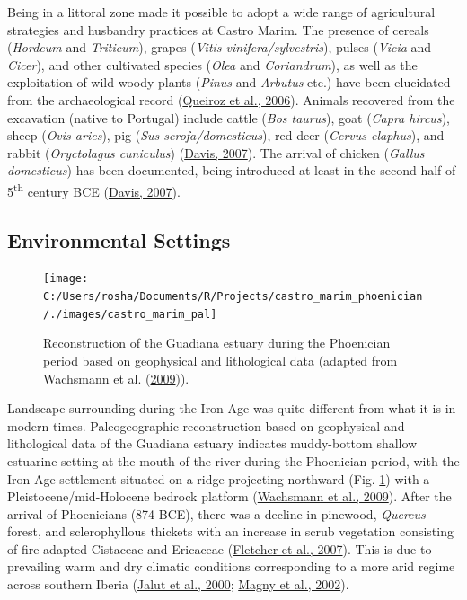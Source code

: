 \documentclass[preprint, 3p, authoryear]{elsarticle} %
\begin{document}
Being in a littoral zone made it possible to adopt a wide range of agricultural strategies and husbandry practices at Castro Marim. The presence of cereals (\emph{Hordeum} and \emph{Triticum}), grapes (\emph{Vitis vinifera/sylvestris}), pulses (\emph{Vicia} and \emph{Cicer}), and other cultivated species (\emph{Olea} and \emph{Coriandrum}), as well as the exploitation of wild woody plants (\emph{Pinus} and \emph{Arbutus} etc.) have been elucidated from the archaeological record (\protect\hyperlink{ref-queiroz_etal06}{Queiroz et al., 2006}). Animals recovered from the excavation (native to Portugal) include cattle (\emph{Bos taurus}), goat (\emph{Capra hircus}), sheep (\emph{Ovis aries}), pig (\emph{Sus scrofa/domesticus}), red deer (\emph{Cervus elaphus}), and rabbit (\emph{Oryctolagus cuniculus}) (\protect\hyperlink{ref-davis07}{Davis, 2007}). The arrival of chicken (\emph{Gallus domesticus}) has been documented, being introduced at least in the second half of 5\textsuperscript{th} century BCE (\protect\hyperlink{ref-davis07}{Davis, 2007}).

\hypertarget{environmental-settings}{%
\subsection{Environmental Settings}\label{environmental-settings}}



\begin{figure}

{\centering \texttt{[image: C:/Users/rosha/Documents/R/Projects/castro\_marim\_phoenician/./images/castro\_marim\_pal]} 

}

\caption{Reconstruction of the Guadiana estuary during the Phoenician period based on geophysical and lithological data (adapted from Wachsmann et al. (\protect\hyperlink{ref-wachsmann_etal09}{2009})).}\label{fig:castro-marim-pal}
\end{figure}

Landscape surrounding during the Iron Age was quite different from what it is in modern times. Paleogeographic reconstruction based on geophysical and lithological data of the Guadiana estuary indicates muddy-bottom shallow estuarine setting at the mouth of the river during the Phoenician period, with the Iron Age settlement situated on a ridge projecting northward (Fig. \ref{fig:castro-marim-pal}) with a Pleistocene/mid-Holocene bedrock platform (\protect\hyperlink{ref-wachsmann_etal09}{Wachsmann et al., 2009}). After the arrival of Phoenicians (874 BCE), there was a decline in pinewood, \emph{Quercus} forest, and sclerophyllous thickets with an increase in scrub vegetation consisting of fire-adapted Cistaceae and Ericaceae (\protect\hyperlink{ref-fletcher_etal07}{Fletcher et al., 2007}). This is due to prevailing warm and dry climatic conditions corresponding to a more arid regime across southern Iberia (\protect\hyperlink{ref-jalut_etal00}{Jalut et al., 2000}; \protect\hyperlink{ref-magny_etal02}{Magny et al., 2002}).
\end{document}
